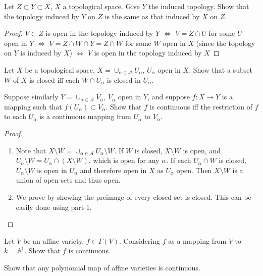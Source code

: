 \documentclass{solution}
\begin{document}
\begin{problem}{6.1}
    Let $Z \subset Y \subset X$, $X$ a topological space. Give $Y$ the induced topology. Show that the topology induced by $Y$ on $Z$ is the same as that induced by $X$ on $Z$.
\end{problem}

\begin{proof}
    $V \subset Z$ is open in the topology induced by $Y$ $\Leftrightarrow$ $V = Z \cap U$ for some $U$ open in $Y$ $\Leftrightarrow$ $V = Z \cap W \cap Y = Z \cap W$ for some $W$ open in $X$ (since the topology on $Y$ is induced by $X$) $\Leftrightarrow$ $V$ is open in the topology induced by $X$
\end{proof}

\begin{problem}{6.2}
    \begin{inparaenum}
        \item Let $X$ be a topological space, $X = \cup_{\alpha \in \mathcal{A}} U_{\alpha}$, $U_\alpha$ open in $X$. Show that a subset $W$ of $X$ is closed iff each $W \cap U_{\alpha}$ is closed in $U_{\alpha}$.
        \item Suppose similarly $Y = \cup_{\alpha \in \mathcal{A}} V_{\alpha}$, $V_{\alpha}$ open in $Y$, and suppose $f: X \rightarrow Y$ is a mapping such that $f(U_\alpha) \subset V_\alpha$. Show that $f$ is continuous iff the restriction of $f$ to each $U_{\alpha}$ is a continuous mapping from $U_{\alpha}$ to $V_{\alpha}$.
    \end{inparaenum}
\end{problem}

\begin{proof}
    \begin{enumerate}
        \item Note that $X \setminus W = \cup_{\alpha \in \mathcal{A}} U_{\alpha} \setminus W$. If $W$ is closed, $X \setminus W$ is open, and $U_{\alpha} \setminus W = U_\alpha \cap (X \setminus W)$, which is open for any $\alpha$. If each $U_\alpha \cap W$ is closed, $U_\alpha \setminus W$ is open in $U_\alpha$ and therefore open in $X$ as $U_\alpha$ open. Then $X \setminus W$ is a union of open sets and thus open.
        \item We prove by showing the preimage of every closed set is closed. This can be easily done using part 1.
    \end{enumerate}
\end{proof}

\begin{problem}{6.3}
    \begin{inparaenum}
        \item Let $V$ be an affine variety, $f \in \Gamma(V)$. Considering $f$ as a mapping from $V$ to $k = \mathbb{A}^1$. Show that $f$ is continuous.
        \item Show that any polynomial map of affine varieties is continuous.
    \end{inparaenum}
\end{problem}
\end{document}
